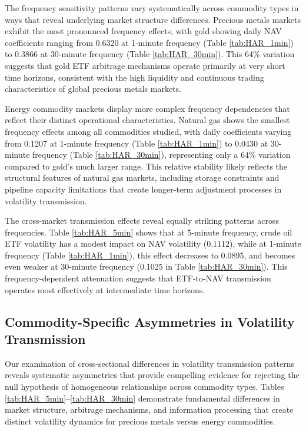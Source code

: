The frequency sensitivity patterns vary systematically across commodity types in ways that reveal underlying market structure differences. Precious metals markets exhibit the most pronounced frequency effects, with gold showing daily NAV coefficients ranging from 0.6320 at 1-minute frequency (Table \ref{tab:HAR_1min}) to 0.3866 at 30-minute frequency (Table \ref{tab:HAR_30min}). This 64\% variation suggests that gold ETF arbitrage mechanisms operate primarily at very short time horizons, consistent with the high liquidity and continuous trading characteristics of global precious metals markets.

Energy commodity markets display more complex frequency dependencies that reflect their distinct operational characteristics. Natural gas shows the smallest frequency effects among all commodities studied, with daily coefficients varying from 0.1207 at 1-minute frequency (Table \ref{tab:HAR_1min}) to 0.0430 at 30-minute frequency (Table \ref{tab:HAR_30min}), representing only a 64\% variation compared to gold's much larger range. This relative stability likely reflects the structural features of natural gas markets, including storage constraints and pipeline capacity limitations that create longer-term adjustment processes in volatility transmission.

The cross-market transmission effects reveal equally striking patterns across frequencies. Table \ref{tab:HAR_5min} shows that at 5-minute frequency, crude oil ETF volatility has a modest impact on NAV volatility (0.1112), while at 1-minute frequency (Table \ref{tab:HAR_1min}), this effect decreases to 0.0895, and becomes even weaker at 30-minute frequency (0.1025 in Table \ref{tab:HAR_30min}). This frequency-dependent attenuation suggests that ETF-to-NAV transmission operates most effectively at intermediate time horizons.

\subsection{Commodity-Specific Asymmetries in Volatility Transmission}

Our examination of cross-sectional differences in volatility transmission patterns reveals systematic asymmetries that provide compelling evidence for rejecting the null hypothesis of homogeneous relationships across commodity types. Tables \ref{tab:HAR_5min}--\ref{tab:HAR_30min} demonstrate fundamental differences in market structure, arbitrage mechanisms, and information processing that create distinct volatility dynamics for precious metals versus energy commodities.

